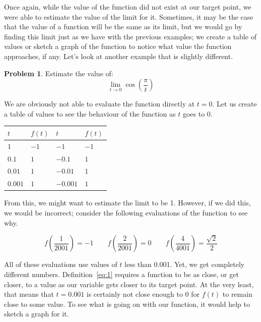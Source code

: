 \documentclass[12pt]{article}
\theoremstyle{definition}
\newtheorem{problem}{Problem}
\begin{document}
Once again, while the value of the function did not exist at our target point, we were able to estimate the value of the limit for it.
Sometimes, it may be the case that the value of a function will be the same as its limit, but we would go by finding this limit just as we have with the previous examples; we create a table of values or sketch a graph of the function to notice what value the function approaches, if any.
Let's look at another example that is slightly different.

\begin{problem}
Estimate the value of:
\begin{equation*}
    \lim_{t\to0} \cos\left(\frac{\pi}{t}\right) \label{eq:5}
\end{equation*}
\end{problem}

We are obviously not able to evaluate the function directly at $t=0$.
Let us create a table of values to see the behaviour of the function as $t$ goes to 0.

\begin{table}[H]
    \renewcommand{\arraystretch}{1.5}
    \centering
    \begin{tabular}{>{\centering\arraybackslash}m{1.5cm}|>{\centering\arraybackslash}m{2.5cm}|>{\centering\arraybackslash}m{1.5cm}|>{\centering\arraybackslash}m{2.5cm}}
        $t$     & $f(t)$ & $t$      & $f(t)$       \\ \hline
        $1$     & $-1	$  & $-1$     & $-1        $ \\
        $0.1$   & $1$    & $-0.1$   & $1$          \\
        $0.01$  & $1$    & $-0.01$  & $1$          \\
        $0.001$ & $1$    & $-0.001$ & $1$
    \end{tabular}
\end{table}

From this, we might want to estimate the limit to be 1.
However, if we did this, we would be incorrect; consider the following evaluations of the function to see why.

\begin{equation*}
    f\left(\frac{1}{2001}\right) = -1 \qquad f\left(\frac{2}{2001}\right) = 0 \qquad f\left(\frac{4}{4001}\right) = \frac{\sqrt{2}}{2}
\end{equation*}

All of these evaluations use values of $t$ less than 0.001.
Yet, we get completely different numbers.
Definition~\eqref{eq:1} requires a function to be as close, or get closer, to a value as our variable gets closer to its target point.
At the very least, that means that $t=0.001$ is certainly not close enough to 0 for $f(t)$ to remain close to some value.
To see what is going on with our function, it would help to sketch a graph for it.
\end{document}
